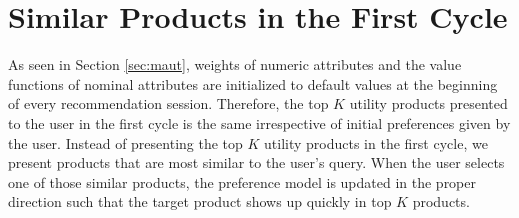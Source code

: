 \section{Similar Products in the First Cycle}
\label{sec:sim}
As seen in Section \ref{sec:maut}, weights of numeric attributes and the value functions of nominal attributes are initialized to default values at the beginning of every recommendation session.
Therefore, the top $K$ utility products presented to the user in the first cycle is the same irrespective of initial preferences given by the user.
Instead of presenting the top $K$ utility products in the first cycle, we present products that are most similar to the user's query.
When the user selects one of those similar products, the preference model is updated in the proper direction such that the target product shows up quickly in top $K$ products.

